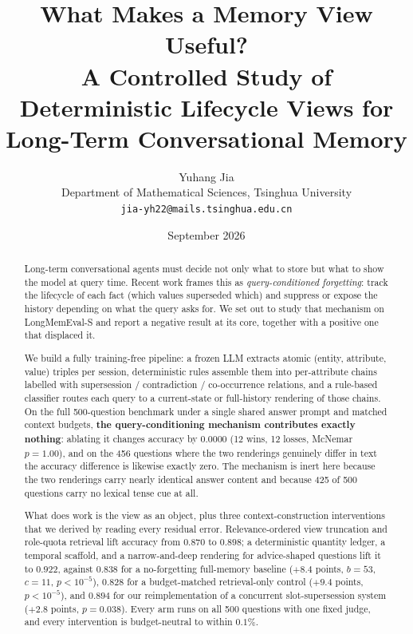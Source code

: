 \documentclass[11pt]{article}
\title{\textbf{What Makes a Memory View Useful?}\\[0.3em]
\large A Controlled Study of Deterministic Lifecycle Views for\\ Long-Term Conversational Memory}
\author{Yuhang Jia\\
Department of Mathematical Sciences, Tsinghua University\\
\texttt{jia-yh22@mails.tsinghua.edu.cn}}
\date{September 2026}
\begin{document}
\maketitle

\begin{abstract}
Long-term conversational agents must decide not only what to store but what to show the model at query time. Recent work frames this as \emph{query-conditioned forgetting}: track the lifecycle of each fact (which values superseded which) and suppress or expose the history depending on what the query asks for. We set out to study that mechanism on LongMemEval-S and report a negative result at its core, together with a positive one that displaced it.

We build a fully training-free pipeline: a frozen LLM extracts atomic (entity, attribute, value) triples per session, deterministic rules assemble them into per-attribute chains labelled with supersession / contradiction / co-occurrence relations, and a rule-based classifier routes each query to a current-state or full-history rendering of those chains. On the full 500-question benchmark under a single shared answer prompt and matched context budgets, \textbf{the query-conditioning mechanism contributes exactly nothing}: ablating it changes accuracy by $0.0000$ (12 wins, 12 losses, McNemar $p = 1.00$), and on the 456 questions where the two renderings genuinely differ in text the accuracy difference is likewise exactly zero. The mechanism is inert here because the two renderings carry nearly identical answer content and because 425 of 500 questions carry no lexical tense cue at all.

What does work is the view as an object, plus three context-construction interventions that we derived by reading every residual error. Relevance-ordered view truncation and role-quota retrieval lift accuracy from $0.870$ to $0.898$; a deterministic quantity ledger, a temporal scaffold, and a narrow-and-deep rendering for advice-shaped questions lift it to $\mathbf{0.922}$, against $0.838$ for a no-forgetting full-memory baseline ($+8.4$ points, $b = 53$, $c = 11$, $p < 10^{-5}$), $0.828$ for a budget-matched retrieval-only control ($+9.4$ points, $p < 10^{-5}$), and $0.894$ for our reimplementation of a concurrent slot-supersession system ($+2.8$ points, $p = 0.038$). Every arm runs on all 500 questions with one fixed judge, and every intervention is budget-neutral to within $0.1\%$.


\end{abstract}
\end{document}
